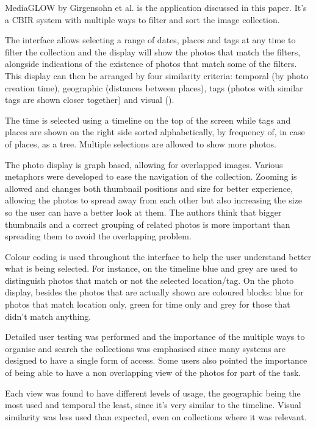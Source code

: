 MediaGLOW by Girgensohn et al. \cite{Girgensohn:2010} is the application discussed in this paper. It's a \ac{CBIR} system with multiple ways to filter and sort the image collection.

The interface allows selecting a range of dates, places and tags at any time to filter the collection and the display will show the photos that match the filters, alongside indications of the existence of photos that match some of the filters. This display can then be arranged by four similarity criteria: temporal (by photo creation time), geographic (distances between places), tags (photos with similar tags are shown closer together) and visual ().

The time is selected using a timeline on the top of the screen while tags and places are shown on the right side sorted alphabetically, by frequency of, in case of places, as a tree. Multiple selections are allowed to show more photos.

The photo display is graph based, allowing for overlapped images. Various metaphors were developed to ease the navigation of the collection. Zooming is allowed and changes both thumbnail positions and size for better experience, allowing the photos to spread away from each other but also increasing the size so the user can have a better look at them. The authors think that bigger thumbnails and a correct grouping of related photos is more important than spreading them to avoid the overlapping problem.

Colour coding is used throughout the interface to help the user understand better what is being selected. For instance, on the timeline blue and grey are used to distinguish photos that match or not the selected location/tag. On the photo display, besides the photos that are actually shown are coloured blocks: blue for photos that match location only, green for time only and grey for those that didn't match anything.

Detailed user testing was performed and the importance of the multiple ways to organise and search the collections was emphasised since many systems are designed to have a single form of access. Some users also pointed the importance of being able to have a non overlapping view of the photos for part of the task.

Each view was found to have different levels of usage, the geographic being the most used and temporal the least, since it's very similar to the timeline. Visual similarity was less used than expected, even on collections where it was relevant. 











